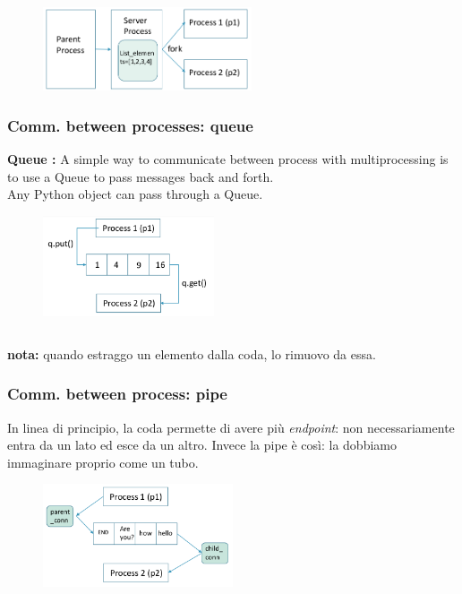 \inputminted{python}{python_parallel/communication3.py}

\begin{figure}[ht]
    \centering
    \includegraphics[width=0.55\textwidth]{figure_parallel/server_process.png}\end{figure}
\FloatBarrier

\subsubsection{Comm. between processes: queue}

\textbf{Queue :} A simple way to communicate between process with multiprocessing is to use a Queue to pass messages back and forth.\\
Any Python object can pass through a Queue.

\begin{figure}[ht]
    \centering
    \includegraphics[width=0.45\textwidth]{figure_parallel/queue.png}\end{figure}
\FloatBarrier


\inputminted{python}{python_parallel/communication4.py}

\textbf{nota:} quando estraggo un elemento dalla coda, lo rimuovo da essa.


\subsubsection{Comm. between process: pipe}

In linea di principio, la coda permette di avere più \textit{endpoint}: non necessariamente entra da un lato ed esce da un altro. Invece la pipe è così: la dobbiamo immaginare proprio come un tubo.

\begin{figure}[ht]
    \centering
    \includegraphics[width=0.5\textwidth]{figure_parallel/pipe.png}\end{figure}
\FloatBarrier

